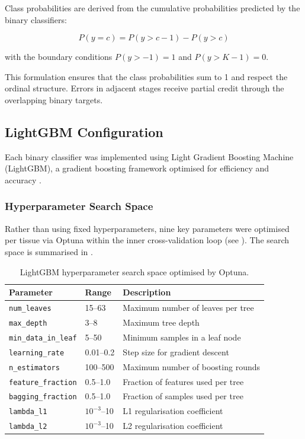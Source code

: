 Class probabilities are derived from the cumulative probabilities predicted by the binary classifiers:

\begin{equation}
    P(y = c) = P(y > c-1) - P(y > c)
    \label{eq:ordinal_probs}
\end{equation}

with the boundary conditions $P(y > -1) = 1$ and $P(y > K-1) = 0$.

This formulation ensures that the class probabilities sum to 1 and respect the ordinal structure. Errors in adjacent stages receive partial credit through the overlapping binary targets.

\subsection{LightGBM Configuration}

Each binary classifier was implemented using Light Gradient Boosting Machine (LightGBM), a gradient boosting framework optimised for efficiency and accuracy \parencite{ke_lightgbm_2017}.

\subsubsection{Hyperparameter Search Space}

Rather than using fixed hyperparameters, nine key parameters were optimised per tissue via Optuna within the inner cross-validation loop (see ). The search space is summarised in .

\begin{table}[H]
\centering
\caption{LightGBM hyperparameter search space optimised by Optuna.}
\label{tab:hyperparameters}
\small
\begin{tabular}{lll}
\toprule
\textbf{Parameter} & \textbf{Range} & \textbf{Description} \\
\midrule
\texttt{num\_leaves}        & 15--63        & Maximum number of leaves per tree \\
\texttt{max\_depth}         & 3--8          & Maximum tree depth \\
\texttt{min\_data\_in\_leaf} & 5--50        & Minimum samples in a leaf node \\
\texttt{learning\_rate}     & 0.01--0.2     & Step size for gradient descent \\
\texttt{n\_estimators}      & 100--500      & Maximum number of boosting rounds \\
\texttt{feature\_fraction}  & 0.5--1.0      & Fraction of features used per tree \\
\texttt{bagging\_fraction}  & 0.5--1.0      & Fraction of samples used per tree \\
\texttt{lambda\_l1}         & $10^{-3}$--10 & L1 regularisation coefficient \\
\texttt{lambda\_l2}         & $10^{-3}$--10 & L2 regularisation coefficient \\
\bottomrule
\end{tabular}
\end{table}

